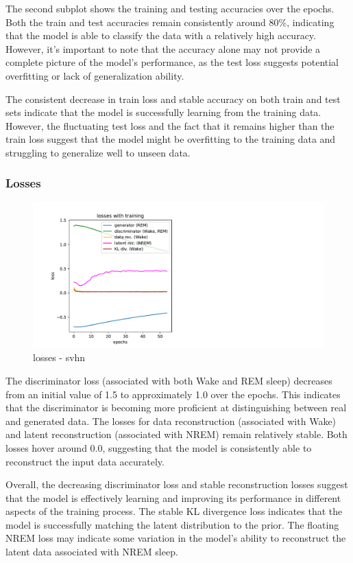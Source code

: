 \documentclass{midl} %
\begin{document}
The second subplot shows the training and testing accuracies over the epochs. Both the train and test accuracies remain consistently around 80\%, indicating that the model is able to classify the data with a relatively high accuracy. However, it's important to note that the accuracy alone may not provide a complete picture of the model's performance, as the test loss suggests potential overfitting or lack of generalization ability.

The consistent decrease in train loss and stable accuracy on both train and test sets indicate that the model is successfully learning from the training data. However, the fluctuating test loss and the fact that it remains higher than the train loss suggest that the model might be overfitting to the training data and struggling to generalize well to unseen data. 



\subsubsection{Losses}
\begin{figure}[H]
  \centering
  \includegraphics[width=1.2\textwidth]{losses_svhn.pdf}
  \caption{losses - svhn}
  \label{fig:losses - svhn}
\end{figure}
The discriminator loss (associated with both Wake and REM sleep) decreases from an initial value of 1.5 to approximately 1.0 over the epochs. This indicates that the discriminator is becoming more proficient at distinguishing between real and generated data. The losses for data reconstruction (associated with Wake) and latent reconstruction (associated with NREM) remain relatively stable.  Both losses hover around 0.0, suggesting that the model is consistently able to reconstruct the input data accurately.

Overall, the decreasing discriminator loss and stable reconstruction losses suggest that the model is effectively learning and improving its performance in different aspects of the training process. The stable KL divergence loss indicates that the model is successfully matching the latent distribution to the prior. The floating NREM loss may indicate some variation in the model's ability to reconstruct the latent data associated with NREM sleep. 
\end{document}
